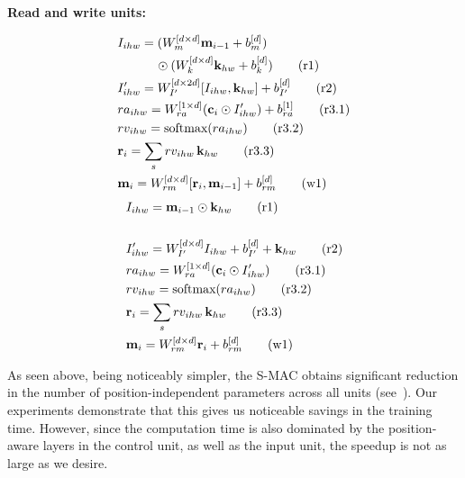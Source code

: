 \noindent\textbf{Read and write units:}
\begin{multicols}{2}
	\noindent
	\begin{align*}
	&I_{ihw} = (W_{m}^{[d \times d]} \mathbf{m}_{i-1} + b_{m}^{[d]}) \\
	           & \qquad \quad \odot (W_{k}^{[d \times d]} \mathbf{k}_{hw} + b_{k}^{[d]}) \tag{r1} \\
	&I'_{ihw} =  W_{I'}^{[d \times 2d]} [I_{ihw},\mathbf{k}_{hw}]  + b_{I'}^{[d]}  \tag{r2} \\
	&ra_{ihw} = W_{ra}^{[1 \times d]} (\mathbf{c}_i \odot I'_{ihw}) + b_{ra}^{[1]} \tag{r3.1}\\
	&rv_{ihw} = \textrm{softmax}(ra_{ihw}) \tag{r3.2}\\
	&\mathbf{r}_i = \sum_s rv_{ihw} \, \mathbf{k}_{hw}  \tag{r3.3}\\
	&\mathbf{m}_i = W_{rm}^{[d \times d]} [\mathbf{r}_i, \mathbf{m}_{i-1}]  + b_{rm}^{[d]} \tag{w1}	
	\end{align*}
	\columnbreak
	{\color{Plum}
	\begin{align*}
	&I_{ihw} = \mathbf{m}_{i-1} \odot \mathbf{k}_{hw} \tag{r1} \\ \\
	&I'_{ihw} = W_{I'}^{[d \times d]} I_{ihw} + b_{I'}^{[d]} + \mathbf{k}_{hw} \tag{r2} \\
	&ra_{ihw} = W_{ra}^{[1 \times d]} (\mathbf{c}_i \odot I'_{ihw})  \tag{r3.1}\\
	&rv_{ihw} = \textrm{softmax}(ra_{ihw}) \tag{r3.2}\\
	&\mathbf{r}_i = \sum_s rv_{ihw} \, \mathbf{k}_{hw}  \tag{r3.3}\\
	&\mathbf{m}_i = W_{rm}^{[d \times d]} \mathbf{r}_i + b_{rm}^{[d]} \tag{w1}
	\end{align*}}
\end{multicols}

As seen above, being noticeably simpler, the S-MAC obtains significant reduction in the number of position-independent parameters across all units (see~).
Our experiments demonstrate that this gives us noticeable savings in the training time. However, since the computation time is also dominated by the position-aware layers in the control unit, as well as the input unit, the speedup is not as large as we desire.